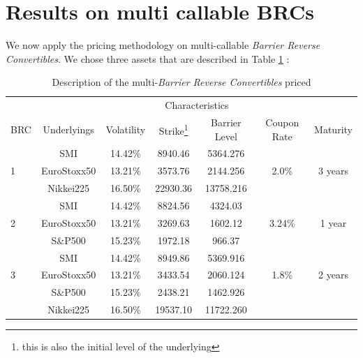 \documentclass[a4paper,11pt,english]{book}
\begin{document}
\section{Results on multi callable BRCs}
We now apply the pricing methodology on multi-callable \textit{Barrier Reverse Convertibles}. We chose three assets that are described in Table \ref{tab:multi-BRC-charachteristics} :

\begin{table}[H]
\centering
\begin{tabular}{l c c c c c c } 
& \multicolumn{6}{c}{Characteristics} \\ 
\cmidrule(l){2-7} 
BRC & Underlyings & Volatility & Strike\footnote{this is also the initial level of the underlying} & Barrier Level & Coupon Rate & Maturity\\ %
\midrule %
 & SMI & 14.42\% & 8940.46 & 5364.276 & & \\ %
1 & EuroStoxx50 & 13.21\% & 3573.76 & 2144.256 & 2.0\% & 3 years\\ %
 & Nikkei225 & 16.50\% & 22930.36 & 13758.216 &  &\\ %
 \midrule %
 & SMI & 14.42\% & 8824.56 & 4324.03 &  & \\ %
2 & EuroStoxx50 & 13.21\% & 3269.63 & 1602.12 & 3.24\% & 1 year\\ %
 & S\&P500 & 15.23\% & 1972.18 & 966.37 & & \\ %
\midrule %
 & SMI & 14.42\% & 8949.86 & 5369.916 &  & \\%
3 & EuroStoxx50 & 13.21\% & 3433.54 & 2060.124 & 1.8\% & 2 years\\ %
 & S\&P500 & 15.23\% & 2438.21 & 1462.926 & &  \\%
  & Nikkei225 & 16.50\% & 19537.10 & 11722.260 & & \\ %
\bottomrule %
\end{tabular}
\caption{Description of the multi-\textit{Barrier Reverse Convertibles} priced}
\label{tab:multi-BRC-charachteristics}
\end{table}
\end{document}
